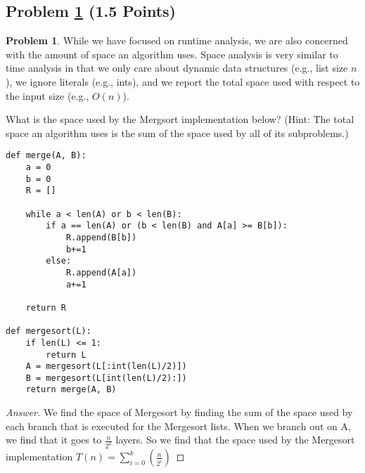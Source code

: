 \documentclass[11pt]{article}
\theoremstyle{definition}
\theoremstyle{definition}
\newtheorem{required}{Problem}
\theoremstyle{definition}
\begin{document}
\subsection{Problem \ref{mergespace} (1.5 Points)}
\begin{required}\label{mergespace}
While we have focused on runtime analysis, we are also concerned with the amount of space an algorithm uses. Space analysis is very similar to time analysis in that we only care about dynamic data structures (e.g., list size $n$), we ignore literals (e.g., ints), and we report the total space used with respect to the input size (e.g., $O(n)$).

What is the space used by the Mergsort implementation below? (Hint: The total space an algorithm uses is the sum of the space used by all of its subproblems.)

\begin{verbatim}
def merge(A, B):
    a = 0
    b = 0
    R = []

    while a < len(A) or b < len(B):
        if a == len(A) or (b < len(B) and A[a] >= B[b]):
            R.append(B[b])
            b+=1
        else:
            R.append(A[a])
            a+=1

    return R

def mergesort(L):
    if len(L) <= 1:
        return L
    A = mergesort(L[:int(len(L)/2)])
    B = mergesort(L[int(len(L)/2):])
    return merge(A, B)
\end{verbatim}

\begin{proof}[Answer]
We find the space of Mergesort by finding the sum of the space used by each branch that is executed for the Mergesort lists. When we branch out on A, we find that it goes to $\frac{n}{2^k}$ layers. So we find that the space used by the Mergesort implementation $T(n) = \displaystyle\sum_{i=0} ^{k} (\frac{n}{2^i})$
\end{proof}

\end{required}
\end{document}
